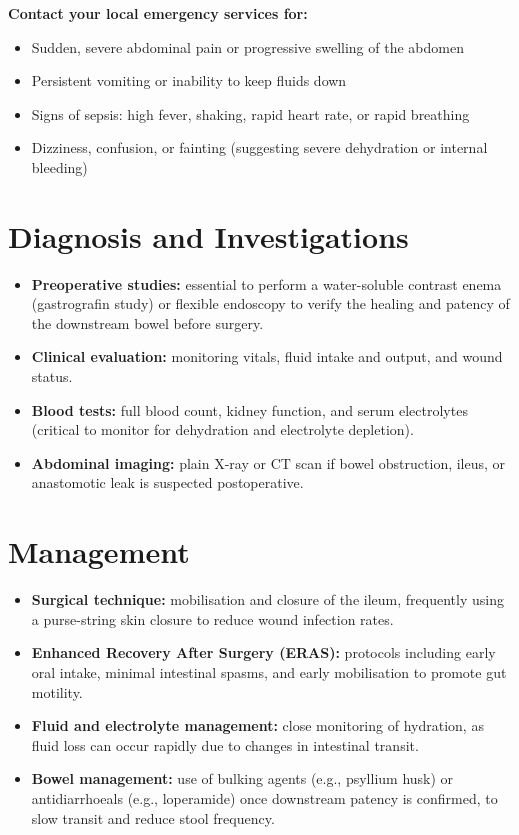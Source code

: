 \textbf{Contact your local emergency services for:}
\begin{itemize}
    \item Sudden, severe abdominal pain or progressive swelling of the abdomen
    \item Persistent vomiting or inability to keep fluids down
    \item Signs of sepsis: high fever, shaking, rapid heart rate, or rapid breathing
    \item Dizziness, confusion, or fainting (suggesting severe dehydration or internal bleeding)
\end{itemize}

\section*{Diagnosis and Investigations}
\begin{itemize}
    \item \textbf{Preoperative studies:} essential to perform a water-soluble contrast enema (gastrografin study) or flexible endoscopy to verify the healing and patency of the downstream bowel before surgery.
    \item \textbf{Clinical evaluation:} monitoring vitals, fluid intake and output, and wound status.
    \item \textbf{Blood tests:} full blood count, kidney function, and serum electrolytes (critical to monitor for dehydration and electrolyte depletion).
    \item \textbf{Abdominal imaging:} plain X-ray or CT scan if bowel obstruction, ileus, or anastomotic leak is suspected postoperative.
\end{itemize}

\section*{Management}
\begin{itemize}
    \item \textbf{Surgical technique:} mobilisation and closure of the ileum, frequently using a purse-string skin closure to reduce wound infection rates.
    \item \textbf{Enhanced Recovery After Surgery (ERAS):} protocols including early oral intake, minimal intestinal spasms, and early mobilisation to promote gut motility.
    \item \textbf{Fluid and electrolyte management:} close monitoring of hydration, as fluid loss can occur rapidly due to changes in intestinal transit.
    \item \textbf{Bowel management:} use of bulking agents (e.g., psyllium husk) or antidiarrhoeals (e.g., loperamide) once downstream patency is confirmed, to slow transit and reduce stool frequency.
\end{itemize}

